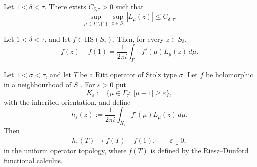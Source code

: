\documentclass[10pt,a4paper]{amsart}
\newcommand{\HS}{\mathrm{HS}}
\begin{document}
\begin{lemma}
\begin{enumerate}[label=\textnormal{(\roman*)}]
\end{enumerate}
\end{lemma}

\begin{lemma}\label{lem:Fmu-uniform}
Let \(1<\delta<\tau\).  There exists %
\(C_{\delta,\tau}>0\) such that
\begin{equation}\label{Fmu}
        \sup_{\mu\in\Gamma_\tau\setminus\{1\}}
        \sup_{z\in S_\delta}
        |L_\mu(z)|
        \le
        C_{\delta,\tau}.
\end{equation}
\end{lemma}

\begin{theorem}\label{thm:scalar-reproducing}
Let \(1<\delta<\tau\), and let \(f\in\HS(S_\tau)\).  Then, for every
\(z\in S_\delta\),
\begin{equation}\label{eq:scalar-reproducing}
        f(z)-f(1)
        =
        \frac{1}{2\pi i}
        \int_{\Gamma_\tau}f'(\mu)L_\mu(z)\,d\mu.
\end{equation}
\end{theorem}

\begin{lemma}\label{lem:rational-truncation-compatibility}
Let $1<\sigma<\tau$, and let $T$ be a Ritt operator of Stolz type
$\sigma$.  Let $f$ be holomorphic in a neighbourhood of $\overline{S_\tau}$.
For $\varepsilon>0$ put
\[
        K_\varepsilon
        :=
        \{\mu\in\Gamma_\tau:\ |\mu-1|\ge\varepsilon\},
\]
with the inherited orientation, and define
\[
        h_\varepsilon(z)
        :=
        \frac1{2\pi i}
        \int_{K_\varepsilon}f'(\mu)L_\mu(z)\,d\mu .
\]
Then
\[
        h_\varepsilon(T)\longrightarrow f(T)-f(1),
        \qquad \varepsilon\downarrow0,
\]
in the uniform operator topology, where $f(T)$ is defined by the Riesz--Dunford functional calculus.
\end{lemma}
\end{document}
